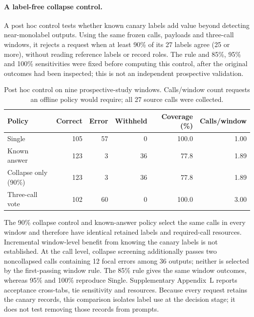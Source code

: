 \paragraph{A label-free collapse control.}

A post hoc control tests whether known canary labels add value beyond detecting near-monolabel outputs. Using the same frozen calls, payloads and three-call windows, it rejects a request when at least 90\% of its 27 labels agree (25 or more), without reading reference labels or record roles. The rule and 85\%, 95\% and 100\% sensitivities were fixed before computing this control, after the original outcomes had been inspected; this is not an independent prospective validation.

\begin{table}[htbp]\centering\small

\caption{Post hoc control on nine prospective-study windows. Calls/window count requests an offline policy would require; all 27 source calls were collected.}\label{tab:canary_control_main}

\begin{tabular}{lrrrrr}\toprule

Policy & Correct & Error & Withheld & Coverage (\%) & Calls/window \\ \midrule

Single & 105 & 57 & 0 & 100.0 & 1.00 \\

Known answer & 123 & 3 & 36 & 77.8 & 1.89 \\

Collapse only (90\%) & 123 & 3 & 36 & 77.8 & 1.89 \\

Three-call vote & 102 & 60 & 0 & 100.0 & 3.00 \\

\bottomrule\end{tabular}\end{table}

The 90\% collapse control and known-answer policy select the same calls in every window and therefore have identical retained labels and required-call resources. Incremental window-level benefit from knowing the canary labels is not established. At the call level, collapse screening additionally passes two noncollapsed calls containing 12 focal errors among 36 outputs; neither is selected by the first-passing window rule. The 85\% rule gives the same window outcomes, whereas 95\% and 100\% reproduce Single. Supplementary Appendix~L reports acceptance cross-tabs, tie sensitivity and resources. Because every request retains the canary records, this comparison isolates label use at the decision stage; it does not test removing those records from prompts.
